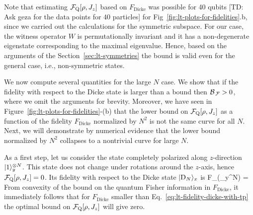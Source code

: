 Note that estimating $\mathcal{F}_{\textnormal{Q}}[{\textstyle \rho, J_z}]$ based on $F_{\text{Dicke}}$ was possible for 40 qubits [TD: Ask geza for the data points for 40 particles] for Fig~\ref{fig:lt-plots-for-fidelities}.b, since we carried out the calculations for the symmetric subspace.
For our case, the witness operator $W$ is permutationally invariant and it has a non-degenerate eigenstate corresponding to the maximal eigenvalue.
Hence, based on the arguments of the Section~\ref{sec:lt-symmetries} the bound is valid even for the general case, i.e., non-symmetric states.

We now compute several quantities for the large $N$ case.
We show that if the fidelity with respect to the Dicke state is larger than a bound then $\mathcal{B}_{\, \mathcal{F} }>0$, where we omit the arguments for brevity.
Moreover, we have seen in Figure~\ref{fig:lt-plots-for-fidelities}-(b) that the lower bound on $\mathcal{F}_{\textnormal{Q}}[{\textstyle \rho,J_z}]$ as a function of the fidelity $F_{\text{Dicke}}$ normalized by $N^2$ is not the same curve for all $N$.
Next, we will demonstrate by numerical evidence that the lower bound normalized by $N^2$ collapses to a nontrivial curve for large $N$.

As a first step, let us consider the state completely polarized along $z$-direction $\vert{1}\rangle_y^{\otimes N}$.
This state does not change under rotations around the $z$-axis, hence $\mathcal{F}_{\textnormal{Q}}[{\textstyle \rho,J_z}]=0$.
Its fidelity with respect to the Dicke state $\vert{\ensuremath{\textnormal{D}_{N}}}\rangle_x$ is
\be
  \label{eq:lt-fidelity-dicke-with-tp}
  F_{}(_y^{\otimes N}) = \approx {}
\ee
From convexity of the bound on the quantum Fisher information in $F_{\text{Dicke}}$, it immediately follows that for $F_{\text{Dicke}}$ smaller than Eq.~\eqref{eq:lt-fidelity-dicke-with-tp} the optimal bound on $\mathcal{F}_{\textnormal{Q}}[{\textstyle \rho,J_z}]$ will give zero.

